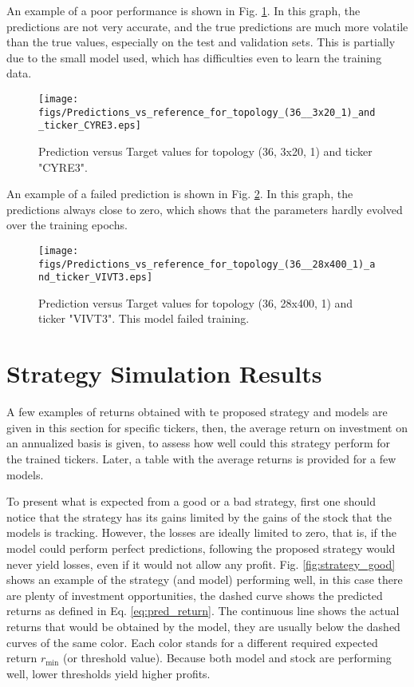 \documentclass[conference]{IEEEtran}
\begin{document}
An example of a poor performance is shown in Fig. \ref{fig:bad_prediction}. In this graph, the predictions are not very accurate, and the true predictions are much more volatile than the true values, especially on the test and validation sets. This is partially due to the small model used, which has difficulties even to learn the training data.

\begin{figure}[htbp]
    \centerline{\texttt{[image: figs/Predictions\_vs\_reference\_for\_topology\_(36\_\_3x20\_1)\_and\_ticker\_CYRE3.eps]}}
    \caption{Prediction versus Target values for topology (36, 3x20, 1) and ticker "CYRE3".}
    \label{fig:bad_prediction}
\end{figure}

An example of a failed prediction is shown in Fig. \ref{fig:failed_prediction}. In this graph, the predictions always close to zero, which shows that the parameters hardly evolved over the training epochs.

\begin{figure}[htbp]
    \centerline{\texttt{[image: figs/Predictions\_vs\_reference\_for\_topology\_(36\_\_28x400\_1)\_and\_ticker\_VIVT3.eps]}}
    \caption{Prediction versus Target values for topology (36, 28x400, 1) and ticker "VIVT3". This model failed training.}
    \label{fig:failed_prediction}
\end{figure}

\section{Strategy Simulation Results}

A few examples of returns obtained with te proposed strategy and models are given in this section for specific tickers, then, the average return on investment on an annualized basis is given, to assess how well could this strategy perform for the trained tickers. Later, a table with the average returns is provided for a few models.

To present what is expected from a good or a bad strategy, first one should notice that the strategy has its gains limited by the gains of the stock that the models is tracking.  However, the losses are ideally limited to zero, that is, if the model could perform perfect predictions, following the proposed strategy would never yield losses, even if it would not allow any profit. Fig. \ref{fig:strategy_good} shows an example of the strategy (and model) performing well, in this case there are plenty of investment opportunities, the dashed curve shows the predicted returns as defined in Eq. \ref{eq:pred_return}. The continuous line shows the actual returns that would be obtained by the model, they are usually below the dashed curves of the same color. Each color stands for a different required expected return $r_{\text{min}}$ (or threshold value). Because both model and stock are performing well, lower thresholds yield higher profits.
\end{document}
